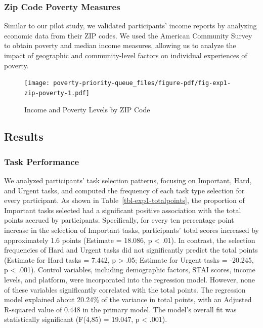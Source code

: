 \documentclass[
]{article}
\begin{document}
\begin{table}
\begin{minipage}[t]{\linewidth}
{}

\end{minipage}%

\end{table}

\hypertarget{zip-code-poverty-measures}{%
\subsubsection{Zip Code Poverty
Measures}\label{zip-code-poverty-measures}}

Similar to our pilot study, we validated participants' income reports by
analyzing economic data from their ZIP codes. We used the American
Community Survey to obtain poverty and median income measures, allowing
us to analyze the impact of geographic and community-level factors on
individual experiences of poverty.

\begin{figure}

{\centering \texttt{[image: poverty-priority-queue\_files/figure-pdf/fig-exp1-zip-poverty-1.pdf]}

}

\caption{\label{fig-exp1-zip-poverty}Income and Poverty Levels by ZIP
Code}

\end{figure}

\hypertarget{results-1}{%
\subsection{Results}\label{results-1}}

\hypertarget{task-performance-1}{%
\subsubsection{Task Performance}\label{task-performance-1}}

We analyzed participants' task selection patterns, focusing on
Important, Hard, and Urgent tasks, and computed the frequency of each
task type selection for every participant. As shown in
Table~\ref{tbl-exp1-totalpoints}, the proportion of Important tasks
selected had a significant positive association with the total points
accrued by participants. Specifically, for every ten percentage point
increase in the selection of Important tasks, participants' total scores
increased by approximately 1.6 points (Estimate = 18.086, p \textless{}
.01). In contrast, the selection frequencies of Hard and Urgent tasks
did not significantly predict the total points (Estimate for Hard tasks
= 7.442, p \textgreater{} .05; Estimate for Urgent tasks = -20.245, p
\textless{} .001). Control variables, including demographic factors,
STAI scores, income levels, and platform, were incorporated into the
regression model. However, none of these variables significantly
correlated with the total points. The regression model explained about
20.24\% of the variance in total points, with an Adjusted R-squared
value of 0.448 in the primary model. The model's overall fit was
statistically significant (F(4,85) = 19.047, p \textless{} .001).
\end{document}
